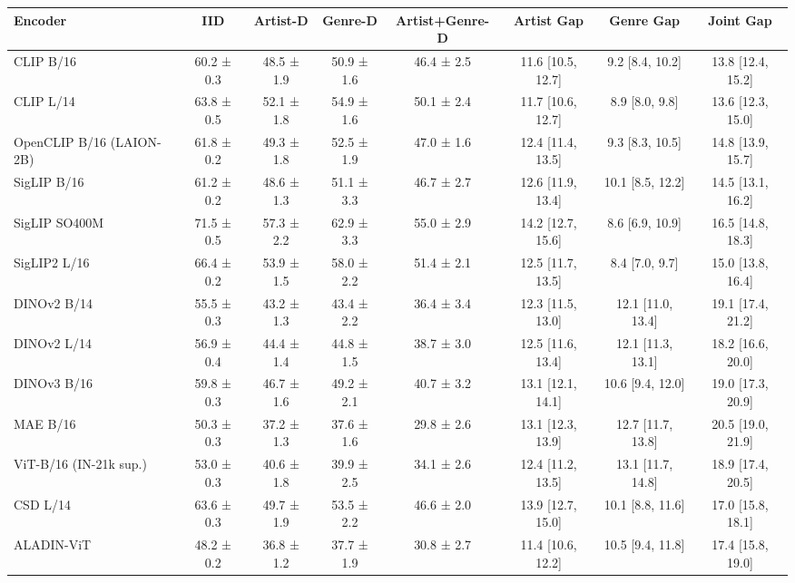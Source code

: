 \begin{tabular}{lccccccc}
\toprule
Encoder & IID & Artist-D & Genre-D & Artist+Genre-D & Artist Gap & Genre Gap & Joint Gap \\
\midrule
CLIP B/16 & 60.2 ± 0.3 & 48.5 ± 1.9 & 50.9 ± 1.6 & 46.4 ± 2.5 & 11.6 [10.5, 12.7] & 9.2 [8.4, 10.2] & 13.8 [12.4, 15.2] \\
CLIP L/14 & 63.8 ± 0.5 & 52.1 ± 1.8 & 54.9 ± 1.6 & 50.1 ± 2.4 & 11.7 [10.6, 12.7] & 8.9 [8.0, 9.8] & 13.6 [12.3, 15.0] \\
OpenCLIP B/16 (LAION-2B) & 61.8 ± 0.2 & 49.3 ± 1.8 & 52.5 ± 1.9 & 47.0 ± 1.6 & 12.4 [11.4, 13.5] & 9.3 [8.3, 10.5] & 14.8 [13.9, 15.7] \\
SigLIP B/16 & 61.2 ± 0.2 & 48.6 ± 1.3 & 51.1 ± 3.3 & 46.7 ± 2.7 & 12.6 [11.9, 13.4] & 10.1 [8.5, 12.2] & 14.5 [13.1, 16.2] \\
SigLIP SO400M & 71.5 ± 0.5 & 57.3 ± 2.2 & 62.9 ± 3.3 & 55.0 ± 2.9 & 14.2 [12.7, 15.6] & 8.6 [6.9, 10.9] & 16.5 [14.8, 18.3] \\
SigLIP2 L/16 & 66.4 ± 0.2 & 53.9 ± 1.5 & 58.0 ± 2.2 & 51.4 ± 2.1 & 12.5 [11.7, 13.5] & 8.4 [7.0, 9.7] & 15.0 [13.8, 16.4] \\
DINOv2 B/14 & 55.5 ± 0.3 & 43.2 ± 1.3 & 43.4 ± 2.2 & 36.4 ± 3.4 & 12.3 [11.5, 13.0] & 12.1 [11.0, 13.4] & 19.1 [17.4, 21.2] \\
DINOv2 L/14 & 56.9 ± 0.4 & 44.4 ± 1.4 & 44.8 ± 1.5 & 38.7 ± 3.0 & 12.5 [11.6, 13.4] & 12.1 [11.3, 13.1] & 18.2 [16.6, 20.0] \\
DINOv3 B/16 & 59.8 ± 0.3 & 46.7 ± 1.6 & 49.2 ± 2.1 & 40.7 ± 3.2 & 13.1 [12.1, 14.1] & 10.6 [9.4, 12.0] & 19.0 [17.3, 20.9] \\
MAE B/16 & 50.3 ± 0.3 & 37.2 ± 1.3 & 37.6 ± 1.6 & 29.8 ± 2.6 & 13.1 [12.3, 13.9] & 12.7 [11.7, 13.8] & 20.5 [19.0, 21.9] \\
ViT-B/16 (IN-21k sup.) & 53.0 ± 0.3 & 40.6 ± 1.8 & 39.9 ± 2.5 & 34.1 ± 2.6 & 12.4 [11.2, 13.5] & 13.1 [11.7, 14.8] & 18.9 [17.4, 20.5] \\
CSD L/14 & 63.6 ± 0.3 & 49.7 ± 1.9 & 53.5 ± 2.2 & 46.6 ± 2.0 & 13.9 [12.7, 15.0] & 10.1 [8.8, 11.6] & 17.0 [15.8, 18.1] \\
ALADIN-ViT & 48.2 ± 0.2 & 36.8 ± 1.2 & 37.7 ± 1.9 & 30.8 ± 2.7 & 11.4 [10.6, 12.2] & 10.5 [9.4, 11.8] & 17.4 [15.8, 19.0] \\
\bottomrule
\end{tabular}
